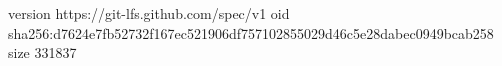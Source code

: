 version https://git-lfs.github.com/spec/v1
oid sha256:d7624e7fb52732f167ec521906df757102855029d46c5e28dabec0949bcab258
size 331837
